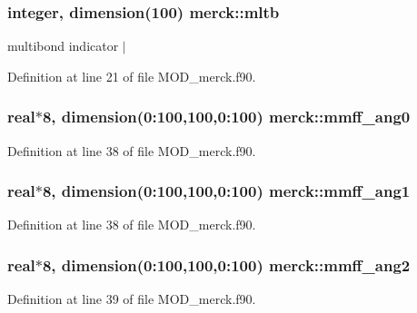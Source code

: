 \hypertarget{classmerck_a43f295aa5639b7b29334db20fdffd179}{
\subsubsection[{mltb}]{\setlength{\rightskip}{0pt plus 5cm}integer, dimension(100) merck\-::mltb}}\label{classmerck_a43f295aa5639b7b29334db20fdffd179}


multibond indicator $|$ 



Definition at line 21 of file M\-O\-D\-\_\-merck.\-f90.

\hypertarget{classmerck_a7559877141f1b4be50c6856d173ea031}{
\subsubsection[{mmff\-\_\-ang0}]{\setlength{\rightskip}{0pt plus 5cm}real$\ast$8, dimension(0\-:100,100,0\-:100) merck\-::mmff\-\_\-ang0}}\label{classmerck_a7559877141f1b4be50c6856d173ea031}


Definition at line 38 of file M\-O\-D\-\_\-merck.\-f90.

\hypertarget{classmerck_a2ab0358d1ee3adc246ee70ba552fe348}{
\subsubsection[{mmff\-\_\-ang1}]{\setlength{\rightskip}{0pt plus 5cm}real$\ast$8, dimension(0\-:100,100,0\-:100) merck\-::mmff\-\_\-ang1}}\label{classmerck_a2ab0358d1ee3adc246ee70ba552fe348}


Definition at line 38 of file M\-O\-D\-\_\-merck.\-f90.

\hypertarget{classmerck_a3fa27d9ab1c59c628afb8e59f653ac43}{
\subsubsection[{mmff\-\_\-ang2}]{\setlength{\rightskip}{0pt plus 5cm}real$\ast$8, dimension(0\-:100,100,0\-:100) merck\-::mmff\-\_\-ang2}}\label{classmerck_a3fa27d9ab1c59c628afb8e59f653ac43}


Definition at line 39 of file M\-O\-D\-\_\-merck.\-f90.


